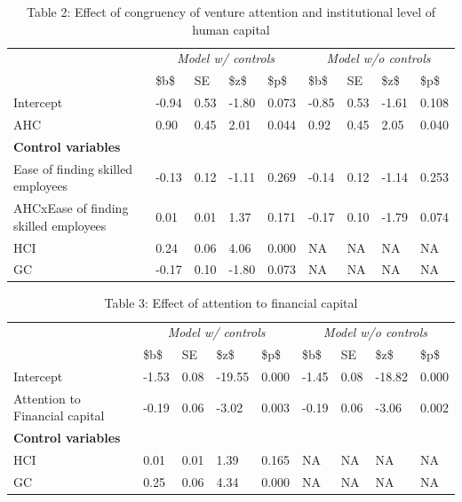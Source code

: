\documentclass[
  english,
  man]{apa6}
\begin{document}
\begin{table}

\caption{\label{tab:unnamed-chunk-18}Table 2: Effect of congruency of venture attention and institutional level of human capital}
\centering
\begin{tabular}[t]{l|l|l|l|l|l|l|l|l}
\hline
\multicolumn{1}{c|}{\em{ }} & \multicolumn{4}{c|}{\em{Model w/ controls}} & \multicolumn{4}{c}{\em{Model w/o controls}} \\
\cline{2-5} \cline{6-9}
  & \$b\$ & SE & \$z\$ & \$p\$ & \$b\$ & SE & \$z\$ & \$p\$\\
\hline
Intercept & -0.94 & 0.53 & -1.80 & 0.073 & -0.85 & 0.53 & -1.61 & 0.108\\
\hline
AHC & 0.90 & 0.45 & 2.01 & 0.044 & 0.92 & 0.45 & 2.05 & 0.040\\
\hline
\multicolumn{9}{l}{\textbf{Control variables}}\\
\hline
\hspace{1em}Ease of finding skilled employees & -0.13 & 0.12 & -1.11 & 0.269 & -0.14 & 0.12 & -1.14 & 0.253\\
\hline
\hspace{1em}AHCxEase of finding skilled employees & 0.01 & 0.01 & 1.37 & 0.171 & -0.17 & 0.10 & -1.79 & 0.074\\
\hline
HCI & 0.24 & 0.06 & 4.06 & 0.000 & NA & NA & NA & NA\\
\hline
GC & -0.17 & 0.10 & -1.80 & 0.073 & NA & NA & NA & NA\\
\hline
\end{tabular}
\end{table}

\begin{table}

\caption{\label{tab:unnamed-chunk-18}Table 3: Effect of attention to financial capital}
\centering
\begin{tabular}[t]{l|l|l|l|l|l|l|l|l}
\hline
\multicolumn{1}{c|}{\em{ }} & \multicolumn{4}{c|}{\em{Model w/ controls}} & \multicolumn{4}{c}{\em{Model w/o controls}} \\
\cline{2-5} \cline{6-9}
  & \$b\$ & SE & \$z\$ & \$p\$ & \$b\$ & SE & \$z\$ & \$p\$\\
\hline
Intercept & -1.53 & 0.08 & -19.55 & 0.000 & -1.45 & 0.08 & -18.82 & 0.000\\
\hline
Attention to Financial capital & -0.19 & 0.06 & -3.02 & 0.003 & -0.19 & 0.06 & -3.06 & 0.002\\
\hline
\multicolumn{9}{l}{\textbf{Control variables}}\\
\hline
\hspace{1em}HCI & 0.01 & 0.01 & 1.39 & 0.165 & NA & NA & NA & NA\\
\hline
\hspace{1em}GC & 0.25 & 0.06 & 4.34 & 0.000 & NA & NA & NA & NA\\
\hline
\end{tabular}
\end{table}
\end{document}
